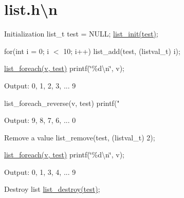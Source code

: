 \hypertarget{list_8h_0Cn-example}{\section{list.\+h\textbackslash{}n}
}
Initialization list\+\_\+t test = N\+U\+L\+L; \hyperlink{list_8h_aa288c0785df071ed8643763202928c82}{list\+\_\+init(test)};

for(int i = 0; i $<$ 10; i++) list\+\_\+add(test, (listval\+\_\+t) i);

\hyperlink{list_8h_a1f44c976d2c698407a17fef984a5b232}{list\+\_\+foreach(v, test)} printf(\char`\"{}\%d\textbackslash{}n\char`\"{}, v);

Output\+: 0, 1, 2, 3, ... 9

\begin{DoxyVerb}list_foreach_reverse(v, test)
    printf("%
\end{DoxyVerb}


Output\+: 9, 8, 7, 6, ... 0

Remove a value list\+\_\+remove(test, (listval\+\_\+t) 2);

\hyperlink{list_8h_a1f44c976d2c698407a17fef984a5b232}{list\+\_\+foreach(v, test)} printf(\char`\"{}\%d\textbackslash{}n\char`\"{}, v);

Output\+: 0, 1, 3, 4, ... 9

Destroy list \hyperlink{list_8h_a9c676c5a77ee9c18ccaadcb4f99fc990}{list\+\_\+destroy(test)};


\begin{DoxyCodeInclude}
\end{DoxyCodeInclude}
 